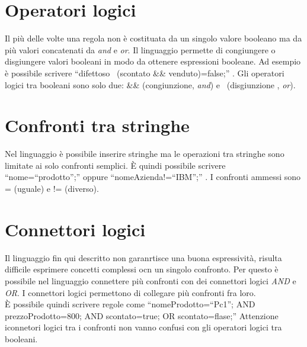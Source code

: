 \section{Operatori logici}
Il pi\`u delle volte una regola non \`e costituata da un singolo valore booleano ma da pi\`u valori concatenati da \textit{and} e \textit{or}. Il linguaggio permette di congiungere o disgiungere valori booleani in modo da ottenere espressioni booleane. Ad esempio \`e possibile scrivere ``difettoso \textbar \textbar\ (scontato \&\& venduto)=false;'' . Gli operatori logici tra booleani sono solo due: \&\& (congiunzione, \textit{and}) e \textbar \textbar\ (disgiunzione , \textit{or}).

\section{Confronti tra stringhe}
Nel linguaggio \`e possibile inserire stringhe ma le operazioni tra stringhe sono limitate ai solo confronti semplici. \`E quindi possibile scrivere ``nome=``prodotto'';'' oppure ``nomeAzienda!=``IBM'';'' . I confronti ammessi sono = (uguale) e != (diverso).

\section{Connettori logici}
Il linguaggio fin qui descritto non garanrtisce una buona espressivit\`a, risulta difficile esprimere concetti complessi ocn un singolo confronto. Per questo \`e possibile nel linguaggio connettere pi\`u confronti con dei connettori logici \textit{AND} e \textit{OR}. I connettori logici permettono di collegare pi\`u confronti fra loro.\\
\`E possibile quindi scrivere regole come ``nomeProdotto=``Pc1''; AND prezzoProdotto=800; AND scontato=true; OR scontato=flase;''
 Attenzione iconnetori logici tra i confronti non vanno confusi con gli operatori logici tra booleani.

